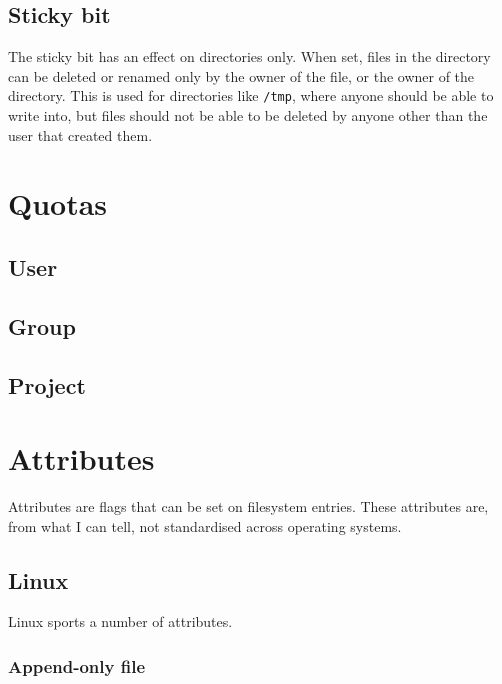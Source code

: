 \documentclass[a4paper]{article}
\begin{document}
\subsection{Sticky bit}

The sticky bit has an effect on directories only. When set, files in the directory can be deleted or renamed only by the owner of the file, or the owner of the directory. This is used for directories like \verb|/tmp|, where anyone should be able to write into, but files should not be able to be deleted by anyone other than the user that created them.

\section{Quotas}

\subsection{User}

\subsection{Group}

\subsection{Project}


\section{Attributes}

Attributes are flags that can be set on filesystem entries. These attributes are, from what I can tell, not standardised across operating systems. 

\subsection{Linux}

Linux sports a number of attributes.


\subsubsection{Append-only file}
\end{document}
